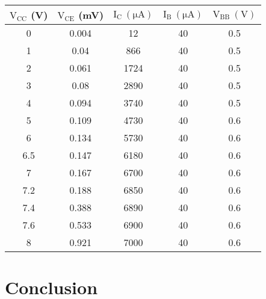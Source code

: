 \documentclass[12pt]{article}
\begin{document}
\begin{table}[H]
    \centering
    \begin{tabular}{|c|c|c|c|c|}
    \hline
        $\mathrm{V_{CC}}$ (V) & $\mathrm{V_{CE}}$ (mV) & $\mathrm{I_C \ (\mu A)}$ & $\mathrm{I_B \ (\mu A)}$ & $\mathrm{V_{BB} \ (V)}$ \\ \hline \hline
        0     & 0.004         & 12           & 40           & 0.5   \\  \hline
        1     & 0.04          & 866          & 40           & 0.5   \\  \hline
        2     & 0.061         & 1724         & 40           & 0.5   \\  \hline
        3     & 0.08          & 2890         & 40           & 0.5   \\  \hline
        4     & 0.094         & 3740         & 40           & 0.5   \\  \hline
        5     & 0.109         & 4730         & 40           & 0.6   \\  \hline
        6     & 0.134         & 5730         & 40           & 0.6   \\  \hline
        6.5   & 0.147         & 6180         & 40           & 0.6   \\  \hline
        7     & 0.167         & 6700         & 40           & 0.6   \\  \hline
        7.2   & 0.188         & 6850         & 40           & 0.6   \\  \hline
        7.4   & 0.388         & 6890         & 40           & 0.6   \\  \hline
        7.6   & 0.533         & 6900         & 40           & 0.6   \\  \hline
        8     & 0.921         & 7000         & 40           & 0.6   \\ \hline
    \end{tabular}
\end{table}

\begin{figure}[H]
    \centering
    
\end{figure}
   
\section{Conclusion}
\end{document}
